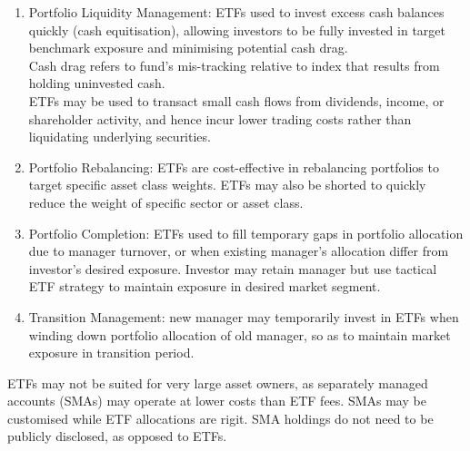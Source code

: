 \begin{remark} 
\begin{enumerate}[label=\roman*.]
\setlength{\itemsep}{0pt}
\item Portfolio Liquidity Management: ETFs used to invest excess cash balances quickly (cash equitisation), allowing investors to be fully invested in target benchmark exposure and minimising potential cash drag.\\
Cash drag refers to fund's mis-tracking relative to index that results from holding uninvested cash.\\
ETFs may be used to transact small cash flows from dividends, income, or shareholder activity, and hence incur lower trading costs rather than liquidating underlying securities.
\item Portfolio Rebalancing: ETFs are cost-effective in rebalancing portfolios to target specific asset class weights. ETFs may also be shorted to quickly reduce the weight of specific sector or asset class.
\item Portfolio Completion: ETFs used to fill temporary gaps in portfolio allocation due to manager turnover, or when existing manager's allocation differ from investor's desired exposure. Investor may retain manager but use tactical ETF strategy to maintain exposure in desired market segment.
\item Transition Management: new manager may temporarily invest in ETFs when winding down portfolio allocation of old manager, so as to maintain market exposure in transition period.
\end{enumerate}
ETFs may not be suited for very large asset owners, as separately managed accounts (SMAs) may operate at lower costs than ETF fees. SMAs may be customised while ETF allocations are rigit. SMA holdings do not need to be publicly disclosed, as opposed to ETFs.
\end{remark}

